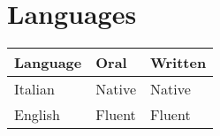 \section{Languages}
\begin{tabular}{lll}
\textbf{Language} & \textbf{Oral} & \textbf{Written} \\
\hline
Italian & Native & Native \\
English & Fluent & Fluent
\end{tabular}

